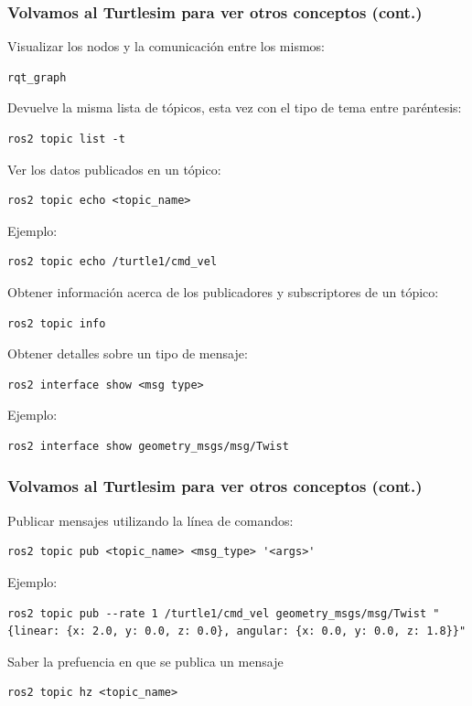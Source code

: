 \begin{frame}[fragile]
    \frametitle{Volvamos al Turtlesim para ver otros conceptos (cont.)}
	\footnotesize
	
Visualizar los nodos y la comunicación entre los mismos:
\begin{lstlisting}[style=bash]  
rqt_graph
\end{lstlisting}

Devuelve la misma lista de tópicos, esta vez con el tipo de tema entre paréntesis:
\begin{lstlisting}[style=bash]  
ros2 topic list -t
\end{lstlisting}
    
Ver los datos publicados en un tópico:
\begin{lstlisting}[style=bash]  
ros2 topic echo <topic_name>
\end{lstlisting}
    
Ejemplo:
\begin{lstlisting}[style=bash]  
ros2 topic echo /turtle1/cmd_vel
\end{lstlisting}
    
Obtener información acerca de los publicadores y subscriptores de un tópico:
\begin{lstlisting}[style=bash]  
ros2 topic info
\end{lstlisting}
    
Obtener detalles sobre un tipo de mensaje:
\begin{lstlisting}[style=bash]  
ros2 interface show <msg type>
\end{lstlisting}    

Ejemplo:
\begin{lstlisting}[style=bash]  
ros2 interface show geometry_msgs/msg/Twist
\end{lstlisting}    

\end{frame}

\begin{frame}[fragile]
	\frametitle{Volvamos al Turtlesim para ver otros conceptos (cont.)}
Publicar mensajes utilizando la línea de comandos:
\begin{lstlisting}[style=bash]  
ros2 topic pub <topic_name> <msg_type> '<args>'
\end{lstlisting}    
Ejemplo:
\begin{lstlisting}[style=bash,basicstyle=\tiny]  
ros2 topic pub --rate 1 /turtle1/cmd_vel geometry_msgs/msg/Twist "{linear: {x: 2.0, y: 0.0, z: 0.0}, angular: {x: 0.0, y: 0.0, z: 1.8}}"
\end{lstlisting}    
Saber la prefuencia en que se publica un mensaje
\begin{lstlisting}[style=bash]  
ros2 topic hz <topic_name>
\end{lstlisting}
    
\end{frame}

